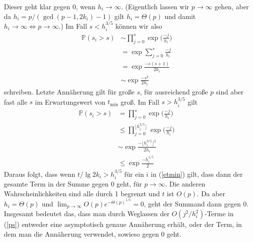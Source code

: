 \documentclass[a4paper, 10pt, ngerman]{article}
\renewcommand{\P}{\mathbb{P}}
\begin{document}
Dieser geht klar gegen 0, wenn $h_i \to \infty$. (Eigentlich lassen wir $p \to \infty$ gehen, aber da $h_i = p/(\gcd(p - 1, 2k_i) - 1)$ gilt $h_i = \Theta(p)$ und damit $h_i \to \infty \Longleftrightarrow p \to \infty$.) Im Fall $s < h_i^{3/5}$ können wir also
\begin{align*}
    \P(s_i > s)
     & \sim \prod_{j = 0}^{s} \exp \bigg ( \frac {-j}{h_i} \bigg ) \\
     & =\exp \sum_{j = 0}^{s} \frac {-j} {h_i}                     \\
     & = \exp \frac {-s (s + 1)} {2h_i}                            \\
     & \sim \exp \frac {-s^2} {2h_i}
\end{align*}
schreiben. Letzte Annäherung gilt für große $s$, für ausreichend große $p$ sind aber fast alle $s$ im Erwartungswert von $t_{\min}$ groß. Im Fall $s > h_i^{3/5}$ gilt
\begin{align*}
    \P(s_i > s)
     & = \prod_{j = 0}^{s} \exp \bigg ( \frac {-j}{h_i} \bigg )                                     \\
     & \le \prod_{j = 0}^{\big \lfloor h_i^{3/5} \big \rfloor} \exp \bigg ( \frac {-j}{h_i} \bigg ) \\
     & \sim \exp \frac {- \Big \lfloor h_i^{3/5} \Big \rfloor^2 } {2h_i}                            \\
     & \le \exp \frac {- h_i^{1/5}} {2}
\end{align*}
Daraus folgt, dass wenn $t / \lg 2k_i > h_i^{3/5}$ für ein $i$ in (\ref{etmin}) gilt, dass dann der gesamte Term in der Summe gegen 0 geht, für $p \to \infty$. Die anderen Wahrscheinlichkeiten sind alle durch 1 begrenzt und $t$ ist $O(p)$. Da aber $h_i = \Theta(p)$ und $\lim_{p \to \infty} O(p) e^{-\Theta(p)^{1/5}} = 0$, geht der Summand dann gegen 0. Insgesamt bedeutet das, dass man durch Weglassen der $O(j^2/h_i^2)$-Terme in (\ref{ps}) entweder eine asymptotisch genaue Annäherung erhält, oder der Term, in dem man die Annäherung verwendet, sowieso gegen 0 geht.
\end{document}
